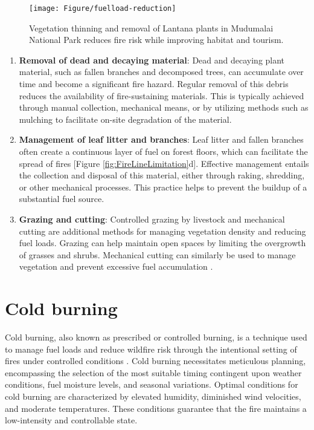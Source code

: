 \documentclass[
  12 pt,
]{Nemilov}
\begin{document}
\begin{figure}

{\centering \texttt{[image: Figure/fuelload-reduction]} 

}

\caption{Vegetation thinning and removal of Lantana plants in Mudumalai National Park reduces fire risk while improving habitat and tourism.}\label{fig:FuelLoadReduction}
\end{figure}

\begin{enumerate}
\def\labelenumi{\arabic{enumi}.}
\setcounter{enumi}{1}
\item
  \textbf{Removal of dead and decaying material}: Dead and decaying plant material, such as fallen branches and decomposed trees, can accumulate over time and become a significant fire hazard. Regular removal of this debris reduces the availability of fire-sustaining materials. This is typically achieved through manual collection, mechanical means, or by utilizing methods such as mulching to facilitate on-site degradation of the material.
\item
  \textbf{Management of leaf litter and branches}: Leaf litter and fallen branches often create a continuous layer of fuel on forest floors, which can facilitate the spread of fires {[}Figure \ref{fig:FireLineLimitation}d{]}. Effective management entails the collection and disposal of this material, either through raking, shredding, or other mechanical processes. This practice helps to prevent the buildup of a substantial fuel source.
\item
  \textbf{Grazing and cutting}: Controlled grazing by livestock and mechanical cutting are additional methods for managing vegetation density and reducing fuel loads. Grazing can help maintain open spaces by limiting the overgrowth of grasses and shrubs. Mechanical cutting can similarly be used to manage vegetation and prevent excessive fuel accumulation \citep{rouet2021effects}.
\end{enumerate}

\section{Cold burning}\label{cold-burning}

Cold burning, also known as prescribed or controlled burning, is a technique used to manage fuel loads and reduce wildfire risk through the intentional setting of fires under controlled conditions \citep{miller2020barriers}. Cold burning necessitates meticulous planning, encompassing the selection of the most suitable timing contingent upon weather conditions, fuel moisture levels, and seasonal variations. Optimal conditions for cold burning are characterized by elevated humidity, diminished wind velocities, and moderate temperatures. These conditions guarantee that the fire maintains a low-intensity and controllable state.
\end{document}
